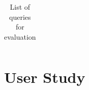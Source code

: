 \begin{table}[!h]
\begin{tabular}{|p{0.80cm}|p{6.0cm}|p{0.80cm}|p{6.0cm}|}
	\end{tabular}
	\caption[List of queries]{List of queries for evaluation}
	\label{tab:Queries}
\end{table}



%
%


\section{User Study} \label{sec:UserStudy}



